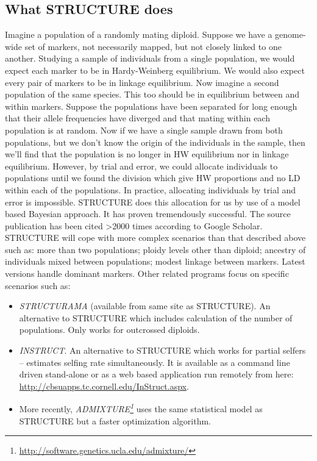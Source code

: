 \documentclass[
]{book}
\renewcommand{\href}[2]{#2\footnote{\url{#1}}}
\begin{document}
\hypertarget{what-structure-does}{%
\subsection{What STRUCTURE does}\label{what-structure-does}}

Imagine a population of a randomly mating diploid. Suppose we have a genome-wide set of markers, not necessarily mapped, but not closely linked to one another. Studying a sample of individuals from a single population, we would expect each marker to be in Hardy-Weinberg equilibrium. We would also expect every pair of markers to be in linkage equilibrium. Now imagine a second population of the same species. This too should be in equilibrium between and within markers. Suppose the populations have been separated for long enough that their allele frequencies have diverged and that mating within each population is at random. Now if we have a single sample drawn from both populations, but we don't know the origin of the individuals in the sample, then we'll find that the population is no longer in HW equilibrium nor in linkage equilibrium. However, by trial and error, we could allocate individuals to populations until we found the division which give HW proportions and no LD within each of the populations. In practice, allocating individuals by trial and error is impossible. STRUCTURE does this allocation for us by use of a model based Bayesian approach. It has proven tremendously successful. The source publication has been cited \textgreater2000 times according to Google Scholar. STRUCTURE will cope with more complex scenarios than that described above such as: more than two populations; ploidy levels other than diploid; ancestry of individuals mixed between populations; modest linkage between markers. Latest versions handle dominant markers. Other related programs focus on specific scenarios such as:

\begin{itemize}
\item
  \emph{STRUCTURAMA} (available from same site as STRUCTURE). An alternative to STRUCTURE which includes calculation of the number of populations. Only works for outcrossed diploids.
\item
  \emph{INSTRUCT}. An alternative to STRUCTURE which works for partial selfers -- estimates selfing rate simultaneously. It is available as a command line driven stand-alone or as a web based application run remotely from here: \url{http://cbsuapps.tc.cornell.edu/InStruct.aspx}.
\item
  More recently, \emph{\href{http://software.genetics.ucla.edu/admixture/}{ADMIXTURE}} uses the same statistical model as STRUCTURE but a faster optimization algorithm.
\end{itemize}
\end{document}
